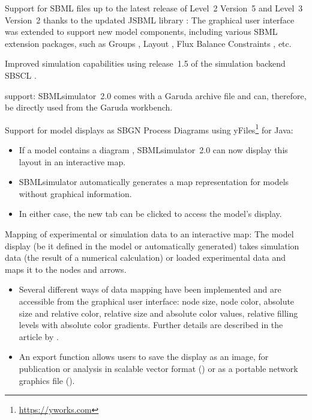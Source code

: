 \begin{dinglist}{52}
\item Support for SBML files up to the latest release of Level~2 Version~5 \citep{Hucka2015} and Level~3 Version~2 \citep{Hucka2019} thanks to the updated JSBML library \citep{Draeger2011, Rodriguez2015}: The graphical user interface was extended to support new model components, including various SBML extension packages, such as Groups \citep{Hucka2016groups}, Layout \citep[][see further description below]{Gauges2015}, Flux Balance Constraints \citep{Olivier2015}, etc.
\item Improved simulation capabilities using release~1.5 of the simulation backend SBSCL \citep{Keller2013}.
\item \Garuda \citep{Ghosh2011} support: SBMLsimulator~2.0 comes with a Garuda archive file and can, therefore, be directly used from the Garuda workbench.
\item Support for model displays as SBGN Process Diagrams \citep{Rougny2019} using yFiles\footnote{\url{https://yworks.com}} for Java\texttrademark:
  \begin{itemize}
  \item If a model contains a diagram \citep[in the format of the SBML Layout Extension][]{Gauges2015}, SBMLsimulator~2.0 can now display this layout in an interactive map.
  \item SBMLsimulator automatically generates a map representation for models without graphical information.
  \item In either case, the new tab  can be clicked to access the model's display.
  \end{itemize}
\item Mapping of experimental or simulation data to an interactive map: The model display (be it defined in the model or automatically generated) takes simulation data (the result of a numerical calculation) or loaded experimental data and maps it to the nodes and arrows.
  \begin{itemize}
  \item Several different ways of data mapping have been implemented and are accessible from the graphical user interface: node size, node color, absolute size and relative color, relative size and absolute color values, relative filling levels with absolute color gradients. Further details are described in the article by \citet{Buchweitz2018}.
  \item An export function allows users to save the display as an image, \eg for publication or analysis in scalable vector format (\SVG) or as a portable network graphics file (\PNG).

\end{itemize}
\end{dinglist}
